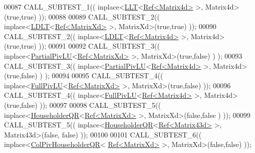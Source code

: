 \begin{DoxyCode}
00087     CALL\_SUBTEST\_1(( inplace<\hyperlink{group___cholesky___module_class_eigen_1_1_l_l_t}{LLT}<\hyperlink{group___core___module_class_eigen_1_1_ref}{Ref<Matrix4d>} >, Matrix4d>(\textcolor{keyword}{true},\textcolor{keyword}{true}) ));
00088 
00089     CALL\_SUBTEST\_2(( inplace<\hyperlink{group___cholesky___module_class_eigen_1_1_l_d_l_t}{LDLT}<\hyperlink{group___core___module_class_eigen_1_1_ref}{Ref<MatrixXd>} >, MatrixXd>(\textcolor{keyword}{true},\textcolor{keyword}{true}) ));
00090     CALL\_SUBTEST\_2(( inplace<\hyperlink{group___cholesky___module_class_eigen_1_1_l_d_l_t}{LDLT}<\hyperlink{group___core___module_class_eigen_1_1_ref}{Ref<Matrix4d>} >, Matrix4d>(\textcolor{keyword}{true},\textcolor{keyword}{true}) ));
00091 
00092     CALL\_SUBTEST\_3(( inplace<\hyperlink{group___l_u___module_class_eigen_1_1_partial_piv_l_u}{PartialPivLU}<\hyperlink{group___core___module_class_eigen_1_1_ref}{Ref<MatrixXd>} >, MatrixXd>(\textcolor{keyword}{true},\textcolor{keyword}{false}) )
      );
00093     CALL\_SUBTEST\_3(( inplace<\hyperlink{group___l_u___module_class_eigen_1_1_partial_piv_l_u}{PartialPivLU}<\hyperlink{group___core___module_class_eigen_1_1_ref}{Ref<Matrix4d>} >, Matrix4d>(\textcolor{keyword}{true},\textcolor{keyword}{false}) )
      );
00094 
00095     CALL\_SUBTEST\_4(( inplace<\hyperlink{group___l_u___module_class_eigen_1_1_full_piv_l_u}{FullPivLU}<\hyperlink{group___core___module_class_eigen_1_1_ref}{Ref<MatrixXd>} >, MatrixXd>(\textcolor{keyword}{true},\textcolor{keyword}{false}) ));
00096     CALL\_SUBTEST\_4(( inplace<\hyperlink{group___l_u___module_class_eigen_1_1_full_piv_l_u}{FullPivLU}<\hyperlink{group___core___module_class_eigen_1_1_ref}{Ref<Matrix4d>} >, Matrix4d>(\textcolor{keyword}{true},\textcolor{keyword}{false}) ));
00097 
00098     CALL\_SUBTEST\_5(( inplace<\hyperlink{group___q_r___module_class_eigen_1_1_householder_q_r}{HouseholderQR}<\hyperlink{group___core___module_class_eigen_1_1_ref}{Ref<MatrixXd>} >, MatrixXd>(\textcolor{keyword}{false},\textcolor{keyword}{false}
      ) ));
00099     CALL\_SUBTEST\_5(( inplace<\hyperlink{group___q_r___module_class_eigen_1_1_householder_q_r}{HouseholderQR}<\hyperlink{group___core___module_class_eigen_1_1_ref}{Ref<Matrix43d>} >, Matrix43d>(\textcolor{keyword}{false},\textcolor{keyword}{
      false}) ));
00100 
00101     CALL\_SUBTEST\_6(( inplace<\hyperlink{group___q_r___module_class_eigen_1_1_col_piv_householder_q_r}{ColPivHouseholderQR}<
      \hyperlink{group___core___module_class_eigen_1_1_ref}{Ref<MatrixXd>} >, MatrixXd>(\textcolor{keyword}{false},\textcolor{keyword}{false}) ));

\end{DoxyCode}
